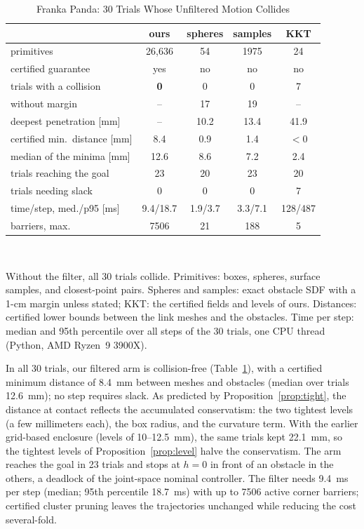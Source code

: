 \documentclass[journal]{IEEEtran}
\theoremstyle{definition}
\newcommand{\timeFrankaMed}{9.4}\newcommand{\timeFrankaPninetyfive}{18.7}
\newcommand{\timeOurs}{9.4/18.7}\newcommand{\timeSph}{1.9/3.7}\newcommand{\timePts}{3.3/7.1}\newcommand{\timeKKT}{128/487}
\begin{document}
\begin{table}[t]
\caption{Franka Panda: 30 Trials Whose Unfiltered Motion Collides}
\label{tab:franka}
\centering
\footnotesize
\setlength{\tabcolsep}{2pt}
\renewcommand{\arraystretch}{1.05}
\begin{tabular}{lcccc}
\toprule
& ours & spheres & samples & KKT\\
\midrule
primitives & 26{,}636 & 54 & 1975 & 24\\
certified guarantee & yes & no & no & no\\
trials with a collision & \textbf{0} & 0 & 0 & 7\\
\quad without margin & -- & 17 & 19 & --\\
\quad deepest penetration [mm] & -- & 10.2 & 13.4 & 41.9\\
certified min.\ distance [mm] & 8.4 & 0.9 & 1.4 & $<0$\\
median of the minima [mm] & 12.6 & 8.6 & 7.2 & 2.4\\
trials reaching the goal & 23 & 20 & 23 & 20\\
trials needing slack & 0 & 0 & 0 & 7\\
time/step, med./p95 [ms] & \timeOurs & \timeSph & \timePts & \timeKKT\\
barriers, max. & 7506 & 21 & 188 & 5\\
\bottomrule
\end{tabular}
\\[3pt]
\parbox{\columnwidth}{\footnotesize Without the filter, all 30 trials collide. Primitives: boxes,
spheres, surface samples, and closest-point pairs. Spheres and samples: exact obstacle SDF with a
1-cm margin unless stated; KKT: the certified fields and levels of ours. Distances: certified lower
bounds between the link meshes and the obstacles. Time per step: median and 95th percentile over all steps of the 30 trials, one CPU thread
(Python, AMD Ryzen~9 3900X).}
\end{table}

In all 30 trials, our filtered arm is collision-free (Table~\ref{tab:franka}), with a certified
minimum distance of 8.4~mm between meshes and obstacles (median over trials 12.6~mm); no step
requires slack. As predicted by Proposition~\ref{prop:tight}, the distance at contact reflects the
accumulated conservatism: the two tightest levels (a few millimeters each), the box radius, and the
curvature term. With the earlier grid-based enclosure (levels of 10--12.5~mm), the same trials kept
22.1~mm, so the tightest levels of Proposition~\ref{prop:level} halve the conservatism. The arm reaches
the goal in 23 trials and stops at $h=0$ in front of an obstacle in the others, a deadlock of the
joint-space nominal controller. The filter needs \timeFrankaMed~ms per step (median; 95th percentile
\timeFrankaPninetyfive~ms) with up to 7506 active corner barriers; certified cluster pruning leaves
the trajectories unchanged while reducing the cost several-fold.
\end{document}
